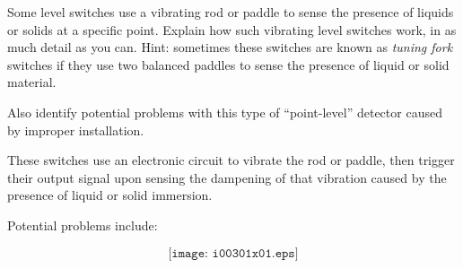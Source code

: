 

Some level switches use a vibrating rod or paddle to sense the presence of liquids or solids at a specific point.  Explain how such vibrating level switches work, in as much detail as you can.  Hint: sometimes these switches are known as {\it tuning fork} switches if they use two balanced paddles to sense the presence of liquid or solid material.

Also identify potential problems with this type of ``point-level'' detector caused by improper installation.







These switches use an electronic circuit to vibrate the rod or paddle, then trigger their output signal upon sensing the dampening of that vibration caused by the presence of liquid or solid immersion.

Potential problems include:

$$\texttt{[image: i00301x01.eps]}$$











